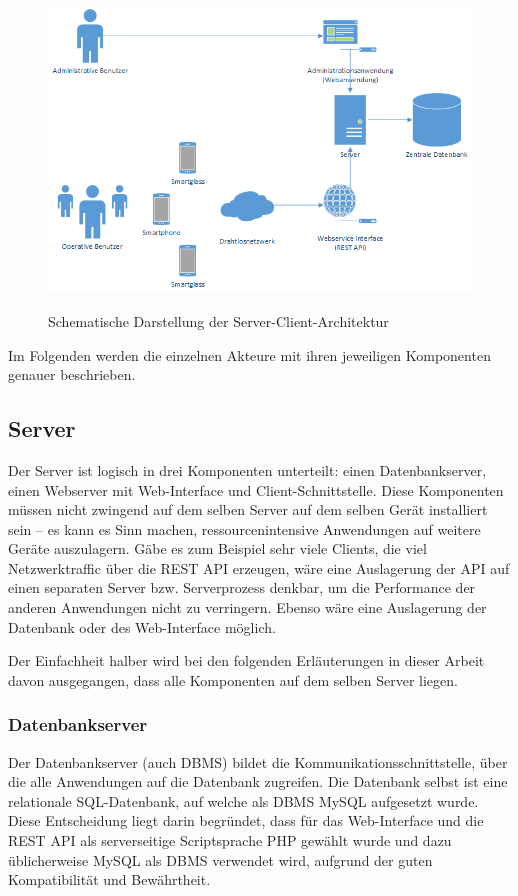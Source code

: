 \begin{figure}[H]
	\centering
	{\includegraphics[width=\textwidth]{Bilder/Abbildungen/architektur_serverclient.png}}
	\caption{Schematische Darstellung der Server-Client-Architektur}
	\label{fig:architektur_serverclient}
\end{figure}

Im Folgenden werden die einzelnen Akteure mit ihren jeweiligen Komponenten genauer beschrieben.

\subsection{Server}

Der Server ist logisch in drei Komponenten unterteilt: einen Datenbankserver, einen Webserver mit Web-Interface und Client-Schnittstelle. Diese Komponenten müssen nicht zwingend auf dem selben Server \bzw auf dem selben Gerät installiert sein -- es kann es Sinn machen, ressourcenintensive Anwendungen auf weitere Geräte auszulagern. Gäbe es zum Beispiel sehr viele Clients, die viel Netzwerktraffic über die REST API erzeugen, wäre eine Auslagerung der API auf einen separaten Server bzw. Serverprozess denkbar, um die Performance der anderen Anwendungen nicht zu verringern. Ebenso wäre eine Auslagerung der Datenbank oder des Web-Interface möglich.

Der Einfachheit halber wird bei den folgenden Erläuterungen in dieser Arbeit davon ausgegangen, dass alle Komponenten auf dem selben Server liegen.

\subsubsection{Datenbankserver}
Der Datenbankserver (auch \ac{DBMS}) bildet die Kommunikationsschnittstelle, über die alle Anwendungen auf die Datenbank zugreifen. Die Datenbank selbst ist eine relationale \acs{SQL}-Datenbank, auf welche als \ac{DBMS} MySQL aufgesetzt wurde. Diese Entscheidung liegt darin begründet, dass für das Web-Interface und die REST API als serverseitige Scriptsprache \acs{PHP} gewählt wurde und dazu üblicherweise MySQL als DBMS verwendet wird, aufgrund der guten Kompatibilität und Bewährtheit.

